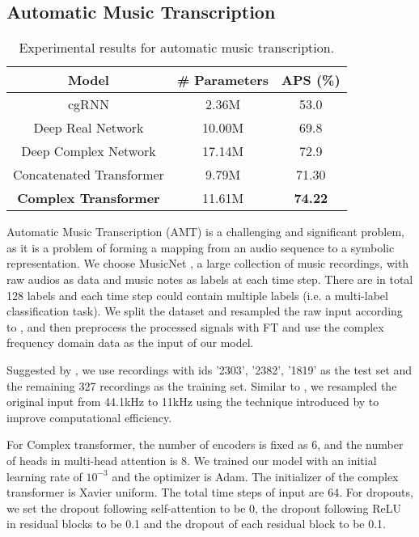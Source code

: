 \documentclass{article}
\begin{document}
\subsection{Automatic Music Transcription}

\begin{table}
\centering
\caption{Experimental results for automatic music transcription.}
\begin{tabular}{c c c}
\toprule
 Model & \# Parameters & APS (\%)  \\
\midrule
cgRNN \cite{wolter2018complex} & 2.36M & 53.0 \\
Deep Real Network \cite{trabelsi2017deep} & 10.00M & 69.8 \\
Deep Complex Network \cite{trabelsi2017deep} & 17.14M & 72.9 \\
Concatenated Transformer & 9.79M & 71.30 \\
\textbf{Complex Transformer} & 11.61M & \textbf{74.22} \\
\bottomrule
\end{tabular}
\label{tab:result_music}
\end{table}

Automatic Music Transcription (AMT) is a challenging and significant problem, as it is a problem of forming a mapping from an audio sequence to a symbolic representation. We choose MusicNet \cite{thickstun2016learning}, a large collection of music recordings, with raw audios as data and music notes as labels at each time step. There are in total 128 labels and each time step could contain multiple labels (i.e. a multi-label classification task). We split the dataset and resampled the raw input according to \cite{trabelsi2017deep}, and then preprocess the processed signals with FT and use the complex frequency domain data as the input of our model. 

Suggested by \cite{thickstun2016learning}, we use recordings with ids ’2303’, ’2382’, ’1819’ as the test set and the remaining 327 recordings as the training set. Similar to \cite{trabelsi2017deep}, we resampled the original input from 44.1kHz to 11kHz using the technique introduced by \cite{smith2002} to improve computational efficiency. 

For Complex transformer, the number of encoders is fixed as 6, and the number of heads in multi-head attention is 8. We trained our model with an initial learning rate of $10^{-3}$ and the optimizer is Adam. The initializer of the complex transformer is Xavier uniform. The total time steps of input are 64. For dropouts, we set the dropout following self-attention to be 0, the dropout following ReLU in residual blocks to be 0.1 and the dropout of each residual block to be 0.1. 
\end{document}
